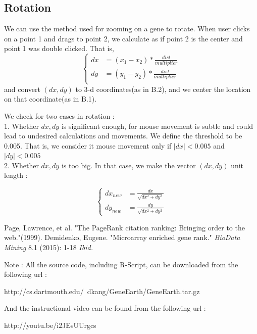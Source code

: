 \documentclass[]{article}
\begin{document}
 \subsection{Rotation}

We can use the method used for zooming on a gene to rotate. When user clicks on a point 1 and drags to point 2, we calculate as if point 2 is the center and point 1 was double clicked. That is,
\[
\begin{cases}
dx &= (x_1 - x_2) * \frac{dist}{multiplier}\\
dy &= (y_1 - y_2) * \frac{dist}{multiplier}\\
\end{cases}
\]
and convert $(dx,dy)$ to 3-d coordinates(as in B.2), and we center the location on that coordinate(as in B.1).

We check for two cases in rotation : \\
1. Whether $dx,dy$ is significant enough, for mouse movement is subtle and could lead to undesired calculations and movements. We define the threshold to be 0.005. That is, we consider it mouse movement only if $|dx| < 0.005$ and $|dy| < 0.005$\\
2. Whether $dx,dy$ is too big. In that case, we make the vector $(dx,dy)$ unit length : 

\begin{equation*}
\begin{cases}
dx_{new} &= \frac{dx}{\sqrt{dx^2+dy^2}}\\
dy_{new} &= \frac{dy}{\sqrt{dx^2+dy^2}}
\end{cases}
\end{equation*}

\begin{thebibliography}{1}
Page, Lawrence, et al. "The PageRank citation ranking: Bringing order to the web."(1999).
Demidenko, Eugene. "Microarray enriched gene rank." \textit{BioData Mining} 8.1 (2015): 1-18
\textit{Ibid.}
\end{thebibliography}

Note : All the source code, including R-Script, can be downloaded from the following url : 
\begin{center}
http://cs.dartmouth.edu/~dkang/GeneEarth/GeneEarth.tar.gz
\end{center}

And the instructional video can be found from the following url : 
\begin{center}
http://youtu.be/i2JEsUUrgcs
\end{center}
\end{document}
